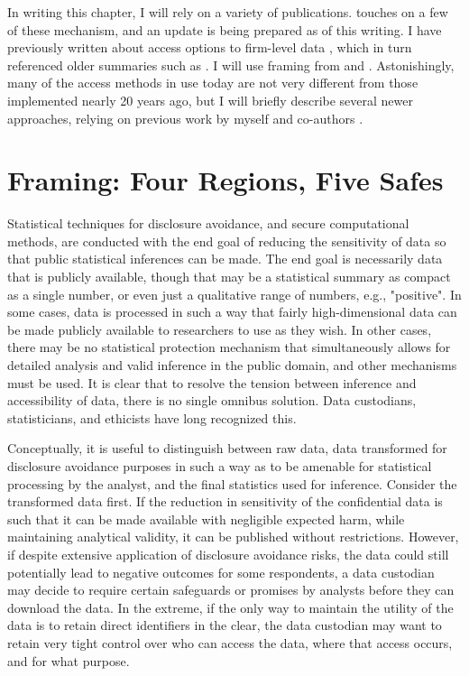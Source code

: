 In writing this chapter, I will rely on a variety of publications. \cite{fcsm_report_2005} touches on a few of these mechanism, and an update is being prepared as of this writing. I have previously written about access options to firm-level data \cite{vilhuber_methods_2013}, which in turn referenced older summaries such as \cite{weinberg_access_2007}. I will use framing from \cite{desai_five_2016} and \cite{altman_towards_2015}. Astonishingly, many of the access methods in use today are not very different from those implemented nearly 20 years ago, but I will briefly describe several newer approaches, relying on previous work by myself and co-authors \cite{shen_physically_2021}.

\section{Framing: Four Regions, Five Safes}

Statistical techniques for disclosure avoidance, and secure computational methods, are conducted with the end goal of reducing the sensitivity of  data so that public statistical inferences can be made. The end goal is necessarily data that is publicly available, though that may be a statistical summary as compact as a single number, or even just a qualitative range of numbers, e.g., "positive". In some cases, data is processed in such a way that fairly high-dimensional data can be made publicly available to researchers to use as they wish. In other cases, there may be no statistical protection mechanism that simultaneously allows for detailed analysis and valid inference in the public domain, and other mechanisms must be used. It is clear that to resolve the tension between inference and accessibility of data, there is no single omnibus solution. Data custodians, statisticians, and ethicists have long recognized this. 

Conceptually, it is useful to distinguish between raw data, data transformed for disclosure avoidance purposes in such a way as to be amenable for statistical processing by the analyst, and the final statistics used for inference. Consider the transformed data first. If the reduction in sensitivity of the confidential data is such that it can be made available with negligible expected harm, while maintaining analytical validity, it can be published without restrictions. However, if despite extensive application of disclosure avoidance risks, the data could still potentially lead to negative outcomes for some respondents, a data custodian may decide to require certain safeguards or promises by analysts before they can download the data. In the extreme, if the only way to maintain the utility of the data is to retain direct identifiers in the clear, the data custodian may want to retain very tight control over who can access the data, where that access occurs, and for what purpose. 

